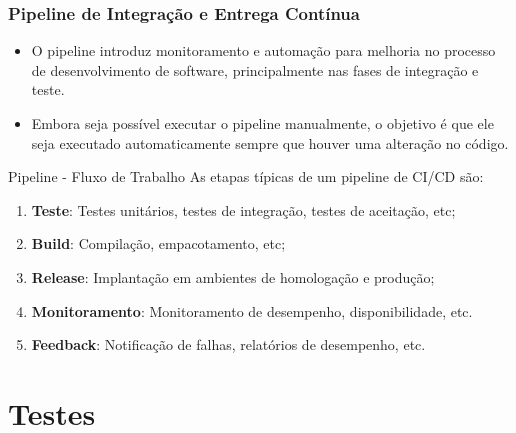 \documentclass[
	9pt, %
	t, %
]{beamer}
\begin{document}
\begin{frame}
	\frametitle{Pipeline de Integração e Entrega Contínua}
	
	\begin{itemize}
		\item O pipeline introduz monitoramento e automação para melhoria no processo de desenvolvimento de software, principalmente nas fases de integração e teste.
		\item Embora seja possível executar o pipeline manualmente, o objetivo é que ele seja executado automaticamente sempre que houver uma alteração no código.
	\end{itemize}
	\begin{block}{Pipeline - Fluxo de Trabalho}
		As etapas típicas de um pipeline de CI/CD são:
		\bigskip

		\begin{enumerate}
			\item \textbf{Teste}: Testes unitários, testes de integração, testes de aceitação, etc;
			\item \textbf{Build}: Compilação, empacotamento, etc;
			\item \textbf{Release}: Implantação em ambientes de homologação e produção;
			\item \textbf{Monitoramento}: Monitoramento de desempenho, disponibilidade, etc.
			\item \textbf{Feedback}: Notificação de falhas, relatórios de desempenho, etc. 
		\end{enumerate}
	\end{block}
		
\end{frame}

\section{Testes}
\end{document}
